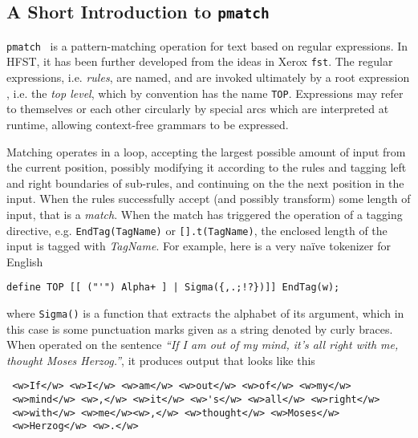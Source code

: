 \documentclass{llncs}
\begin{document}
\subsection{A Short Introduction to {\tt pmatch}}

\verb+pmatch+~\cite{hfst-pmatch} is a pattern-matching operation for text based
on regular expressions. In HFST, it has been further developed from the ideas in Xerox
\verb+fst+. The regular expressions, i.e. \emph{rules}, are named, and are
invoked ultimately by a root expression , i.e. the \emph{top level}, which by convention
has the name \verb+TOP+. Expressions may refer to themselves or each other
circularly by special arcs which are interpreted at runtime, allowing
context-free grammars to be expressed.

Matching operates in a loop, accepting the largest
possible amount of input from the current position, possibly modifying it
according to the rules and tagging left and right boundaries of sub-rules, and
continuing on the the next position in the input. 
When the rules successfully accept (and possibly transform) some length of
input, that is a \emph{match}.
When the match has triggered the operation of a tagging directive, e.g. 
\verb+EndTag(TagName)+ or \verb+[].t(TagName)+, the enclosed length of the input is tagged with \emph{TagName}. 
For example, here is a very naïve tokenizer for English

\begin{center}
  \begin{framed}
\begin{verbatim}
define TOP [[ ("'") Alpha+ ] | Sigma({,.;!?})]] EndTag(w);
\end{verbatim}
  \end{framed}
\end{center}

\noindent where \verb+Sigma()+ is a function that extracts the alphabet of its argument, which in this case is
some punctuation marks given as a string denoted by curly braces.
When operated on the sentence
\emph{``If I am out of my mind, it's all right with me, thought Moses Herzog.''},
it produces output that looks like this

\begin{verbatim}
 <w>If</w> <w>I</w> <w>am</w> <w>out</w> <w>of</w> <w>my</w>
 <w>mind</w> <w>,</w> <w>it</w> <w>'s</w> <w>all</w> <w>right</w> 
 <w>with</w> <w>me</w><w>,</w> <w>thought</w> <w>Moses</w>
 <w>Herzog</w> <w>.</w>
\end{verbatim}
\end{document}

